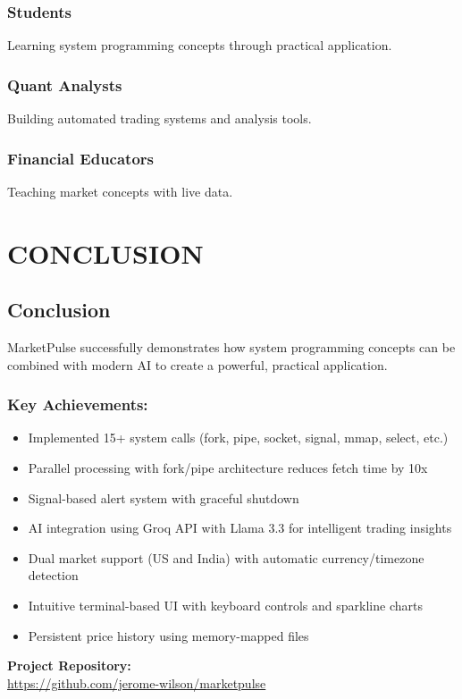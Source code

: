 \documentclass[12pt,a4paper]{article}
\begin{document}
\subsubsection{Students}
Learning system programming concepts through practical application.

\subsubsection{Quant Analysts}
Building automated trading systems and analysis tools.

\subsubsection{Financial Educators}
Teaching market concepts with live data.

\newpage

\section{CONCLUSION}

\subsection{Conclusion}

MarketPulse successfully demonstrates how system programming concepts can be combined with modern AI to create a powerful, practical application.

\subsubsection{Key Achievements:}
\begin{itemize}[itemsep=0.3em]
    \item Implemented 15+ system calls (fork, pipe, socket, signal, mmap, select, etc.)
    \item Parallel processing with fork/pipe architecture reduces fetch time by 10x
    \item Signal-based alert system with graceful shutdown
    \item AI integration using Groq API with Llama 3.3 for intelligent trading insights
    \item Dual market support (US and India) with automatic currency/timezone detection
    \item Intuitive terminal-based UI with keyboard controls and sparkline charts
    \item Persistent price history using memory-mapped files
\end{itemize}

\begin{center}
\textbf{Project Repository:}\\
\url{https://github.com/jerome-wilson/marketpulse}
\end{center}
\end{document}
